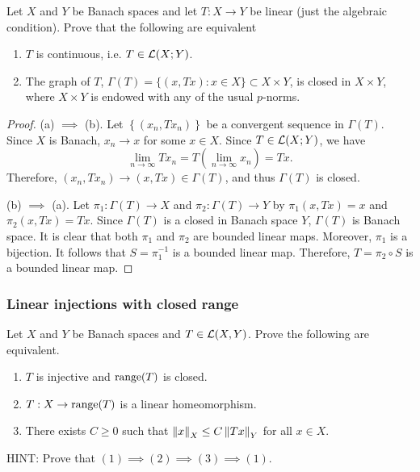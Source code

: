 \documentclass[a4paper]{article}
\begin{document}
\begin{thm}
    Let $X$ and $Y$ be Banach spaces and let $T : X \to Y$
    be linear (just the algebraic condition).
    Prove that the following are equivalent
\end{thm}
\begin{enumerate}
\item $T$ is continuous, i.e. $T \in \mathcal{L}(X;Y)$.
\item The graph of $T$, $\Gamma(T) = \{(x,Tx) : x \in X\}
\subset X \times Y$, is closed in $X \times Y$, where
$X \times Y$ is endowed with any of the usual $p$-norms.
\end{enumerate}

\begin{proof}
  (a) $\implies$ (b). Let $\left\{ (x_n, T x_n) \right\}$ be a convergent sequence
  in $\Gamma(T)$. Since $X$ is Banach, $x_n \to x$ for some $x \in X$.
  Since $T \in \mathcal{L}(X ; Y)$, we have
  \[
  \lim_{n \to \infty} T x_n = T \left( \lim_{n \to \infty} x_n \right) = T x.
  \]
  Therefore, $(x_n, T x_n) \to (x, T x) \in \Gamma(T)$, and thus
  $\Gamma(T)$ is closed.

  (b) $\implies$ (a). Let $\pi_1 : \Gamma(T) \to X$ and
  $\pi_2 : \Gamma(T) \to Y$ by
  $\pi_1 (x, T x) = x$ and $\pi_2 (x, T x) = Tx$. Since
  $\Gamma(T)$ is a closed in Banach space $Y$,
  $\Gamma(T)$ is Banach space. It is clear that both $\pi_1$
  and $\pi_2$ are bounded linear maps. Moreover, $\pi_1$ is a
  bijection. It follows that $S = \pi_1^{-1}$ is a bounded linear
  map. Therefore, $T = \pi_2 \circ S$ is a bounded linear map.

\end{proof}

\subsubsection*{Linear injections with closed range}
\begin{thm}
    Let $X$ and $Y$ be Banach spaces and $T \in \mathcal{L}(X,Y)$.
    Prove the following are equivalent.
\begin{enumerate}
 \item $T$ is injective and $\operatorname{range}(T)$ is closed.
 \item $T : X \to \operatorname{range}(T)$ is a linear homeomorphism.
 \item There exists $C\ge 0$ such that $\left\lVert x\right\rVert_X \le C
 \left\lVert Tx\right\rVert_Y$ for all $x \in X$.
\end{enumerate}
HINT: Prove that $(1) \implies (2) \implies (3) \implies
(1)$.
\end{thm}
\end{document}
